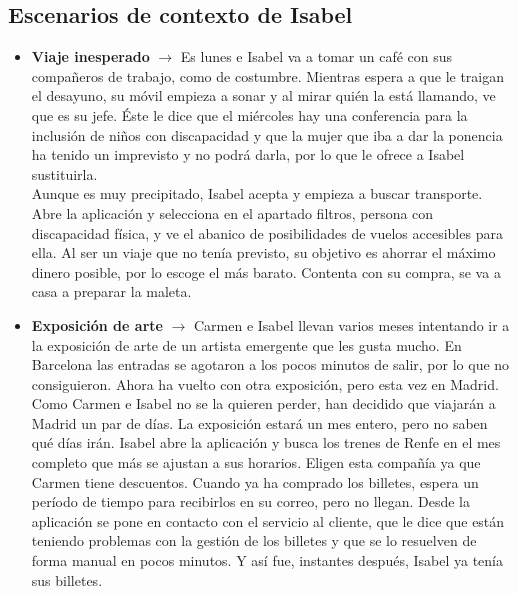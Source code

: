 \subsection{Escenarios de contexto de Isabel}
\begin{itemize}
    \item \textbf{Viaje inesperado} $\rightarrow$ Es lunes e Isabel va a tomar un café con sus compañeros de trabajo, como de costumbre. Mientras espera a 
    que le traigan el desayuno, su móvil empieza a sonar y al mirar quién la está llamando, ve que es su jefe. Éste le dice que el miércoles hay una conferencia 
    para la inclusión de niños con discapacidad y que la mujer que iba a dar la ponencia ha tenido un imprevisto y no podrá darla, por lo que le ofrece a Isabel 
    sustituirla. \\

    Aunque es muy precipitado, Isabel acepta y empieza a buscar transporte. Abre la aplicación y selecciona en el apartado filtros, persona con discapacidad 
    física, y ve el abanico de posibilidades de vuelos accesibles para ella. Al ser un viaje que no tenía previsto, su objetivo es ahorrar el máximo dinero 
    posible, por lo escoge el más barato. Contenta con su compra, se va a casa a preparar la maleta.
    \item \textbf{Exposición de arte} $\rightarrow$ Carmen e Isabel llevan varios meses intentando ir a la exposición de arte de un artista emergente que les 
    gusta mucho. En Barcelona las entradas se agotaron a los pocos minutos de salir, por lo que no consiguieron. Ahora ha vuelto con otra exposición, pero esta 
    vez en Madrid. \\

    Como Carmen e Isabel no se la quieren perder, han decidido que viajarán a Madrid un par de días. La exposición estará un mes entero, pero no saben qué días irán.
    Isabel abre la aplicación y busca los trenes de Renfe en el mes completo que más se ajustan a sus horarios. Eligen esta compañía ya que Carmen tiene 
    descuentos. Cuando ya ha comprado los billetes, espera un período de tiempo para recibirlos en su correo, pero no llegan. Desde la aplicación se pone en contacto 
    con el servicio al cliente, que le dice que están teniendo problemas con la gestión de los billetes y que se lo resuelven de forma manual en pocos minutos. Y así 
    fue, instantes después, Isabel ya tenía sus billetes.
\end{itemize}

